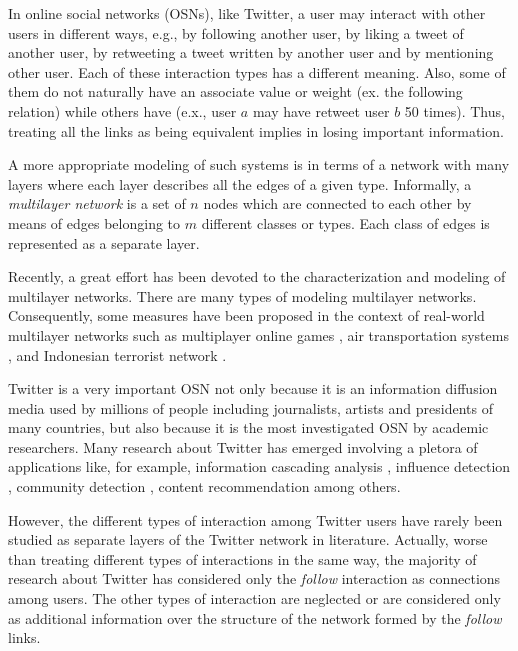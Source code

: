 In online social networks (OSNs), like Twitter, a user may interact with other users in different ways, e.g., by following another user, by liking a tweet of another user, by retweeting a tweet written by another user and by mentioning  other user. Each of these interaction types has a different meaning. Also, some of them do not naturally have an associate value or weight (ex. the following relation) while others have (e.x.,  user $a$ may have retweet  user $b$ 50 times). Thus, treating all the links as being equivalent implies in losing  important information.  

A more appropriate modeling of such systems is in terms of  a network with many layers where  each layer describes all the edges of a given type. Informally, a {\em multilayer network}  is a  set of $n$ nodes which are connected to each other by means of edges belonging to $m$ different classes or types. Each class of edges is represented as a separate layer.  

Recently, a great effort has been devoted to the characterization and modeling of multilayer networks. There are many types of modeling multilayer networks. Consequently, some  measures have been proposed in the context of real-world multilayer networks such as multiplayer online games \cite{Szell2010}, air transportation systems \cite{Cardilo2013}, and Indonesian terrorist network \cite{Battiston2014}. 

Twitter is a very important OSN not only because it is an information diffusion media used by millions of people including journalists, artists and presidents of many countries, but also because it is the most  investigated OSN by academic researchers. Many research about Twitter has emerged  involving a pletora of applications like, for example, information cascading analysis \cite{HU2017, Hakim2014}, influence detection \cite{Chen:2014,Haddadi2010}, community detection \cite{McAuley:2012,GADEK2017584}, content recommendation \cite{Hong:2013,Chen2012,Jiang:2016} among others.

However, the different types of interaction among Twitter users have rarely been studied as separate layers of the Twitter network in literature. Actually, worse than treating different types of interactions in the same way, the majority of research about Twitter has considered only the {\em follow} interaction as connections among users. The other types of interaction are neglected or are considered only as additional information over the structure of the network formed by the {\em follow} links. 

